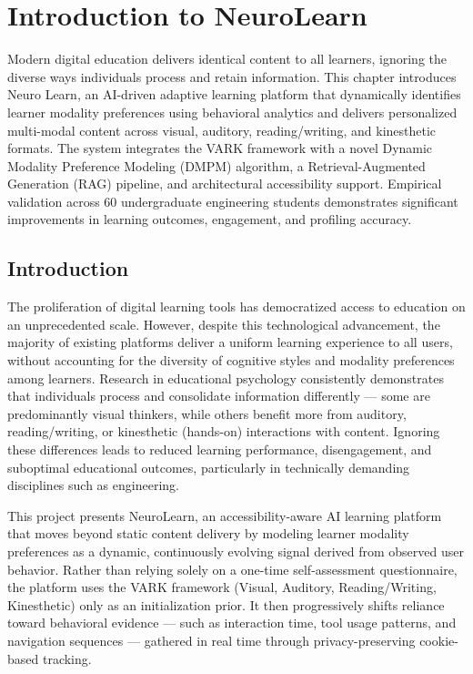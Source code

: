 \chapter{Introduction to NeuroLearn}

Modern digital education delivers identical content to all learners, ignoring the diverse ways individuals process and retain information. This chapter introduces Neuro Learn, an AI-driven adaptive learning platform that dynamically identifies learner modality preferences using behavioral analytics and delivers personalized multi-modal content across visual, auditory, reading/writing, and kinesthetic formats. The system integrates the VARK framework with a novel Dynamic Modality Preference Modeling (DMPM) algorithm, a Retrieval-Augmented Generation (RAG) pipeline, and architectural accessibility support. Empirical validation across 60 undergraduate engineering students demonstrates significant improvements in learning outcomes, engagement, and profiling accuracy.

\section[Introduction]{\textbf{Introduction}}

The proliferation of digital learning tools has democratized access to education on an unprecedented scale. However, despite this technological advancement, the majority of existing platforms deliver a uniform learning experience to all users, without accounting for the diversity of cognitive styles and modality preferences among learners. Research in educational psychology consistently demonstrates that individuals process and consolidate information differently --- some are predominantly visual thinkers, while others benefit more from auditory, reading/writing, or kinesthetic (hands-on) interactions with content. Ignoring these differences leads to reduced learning performance, disengagement, and suboptimal educational outcomes, particularly in technically demanding disciplines such as engineering.

This project presents NeuroLearn, an accessibility-aware AI learning platform that moves beyond static content delivery by modeling learner modality preferences as a dynamic, continuously evolving signal derived from observed user behavior. Rather than relying solely on a one-time self-assessment questionnaire, the platform uses the VARK framework (Visual, Auditory, Reading/Writing, Kinesthetic) only as an initialization prior. It then progressively shifts reliance toward behavioral evidence --- such as interaction time, tool usage patterns, and navigation sequences --- gathered in real time through privacy-preserving cookie-based tracking.

